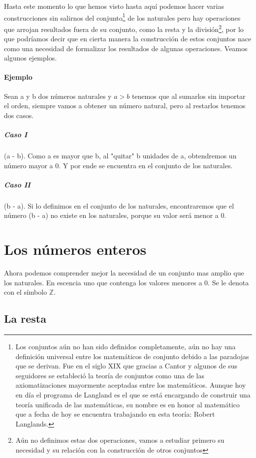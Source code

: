 \documentclass{article}
\begin{document}
Hasta este momento lo que hemos visto hasta aquí podemos hacer varias construcciones sin salirnos del conjunto\footnote{Los conjuntos aún no han sido definidos completamente, aún no hay una definición universal entre los matemáticos de conjunto debido a las paradojas que se derivan. Fue en el siglo XIX que gracias a Cantor y algunos de sus seguidores se estableció la teoría de conjuntos como una de las axiomatizaciones mayormente aceptadas entre los matemáticos. Aunque hoy en día el programa de Langland es el que se está encargando de construir una teoría unificada de las matemáticas, su nombre es en honor al matemático que a fecha de hoy se encuentra trabajando en esta teoría: Robert Langlands.} de los naturales pero hay operaciones que arrojan resultados fuera de su conjunto, como la resta y la división\footnote{Aún no definimos estas dos operaciones, vamos a estudiar primero su necesidad y su relación con la construcción de otros conjuntos}, por lo que podríamos decir que en cierta manera la construcción de estos conjuntos nace como una necesidad de formalizar los resultados de algunas operaciones. Veamos algunos ejemplos.

\paragraph{Ejemplo} Sean a y b dos números naturales y $a > b$ tenemos que al sumarlos sin importar el orden, siempre vamos a obtener un número natural, pero al restarlos tenemos dos casos.

\subparagraph{Caso I} (a - b). Como a es mayor que b, al "quitar" b unidades de a, obtendremos un número mayor a 0. Y por ende se encuentra en el conjunto de los naturales.

\subparagraph{Caso II} (b - a). Si lo definimos en el conjunto de los naturales, encontraremos que el número (b - a) no existe en los naturales, porque su valor será menor a 0.

\section{Los números enteros}

Ahora podemos comprender mejor la necesidad de un conjunto mas amplio que los naturales. En escencia uno que contenga los valores menores a 0. Se le denota con el símbolo $\mathbb{Z}$.

\subsection{La resta}
\end{document}
